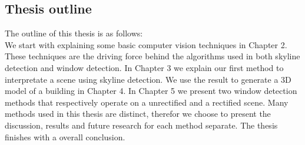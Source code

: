 \subsection{Thesis outline}
The outline of this thesis is as follows:\\
We start with explaining some basic computer vision techniques in Chapter 2.
These techniques are the driving force behind the algorithms used in both
skyline detection and window detection.  In Chapter 3 we explain our first
method to interpretate a scene using skyline detection.  We use the result to
generate a 3D model of a building in Chapter 4.  In Chapter 5 we present two
window detection methods that respectively operate on a unrectified and a
rectified scene.  Many methods used in this thesis are distinct, therefor we
choose to present the discussion, results and future research for each method
separate.  The thesis finishes with a overall conclusion.


